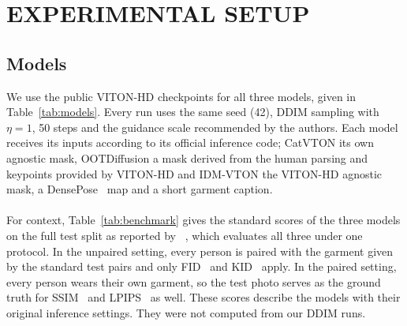 \section{\uppercase{Experimental Setup}}
\label{sec:setup}

\subsection{Models}
We use the public VITON-HD checkpoints for all three models, given in Table~\ref{tab:models}. Every run uses the same seed (42), DDIM sampling with $\eta = 1$, 50 steps and the guidance scale recommended by the authors. Each model receives its inputs according to its official inference code; CatVTON its own agnostic mask, OOTDiffusion a mask derived from the human parsing and keypoints provided by VITON-HD and IDM-VTON the VITON-HD agnostic mask, a DensePose~\cite{guler2018densepose} map and a short garment caption.
\\ \\
For context, Table~\ref{tab:benchmark} gives the standard scores of the three models on the full \vitonhd test split as reported by \catvton~\cite{chong2025catvton}, which evaluates all three under one protocol. In the unpaired setting, every person is paired with the garment given by the standard test pairs and only FID~\cite{heusel2017fid} and KID~\cite{binkowski2018kid} apply. In the paired setting, every person wears their own garment, so the test photo serves as the ground truth for SSIM~\cite{wang2004ssim} and LPIPS~\cite{zhang2018lpips} as well. These scores describe the models with their original inference settings. They were not computed from our DDIM runs.
\\ \\
\begin{table}[h]
\caption{Models and sampling settings of the trajectory analysis. All models are sampled with DDIM, $\eta = 1$, 50 steps; CFG corresponds to the classifier-free guidance scale.}
\label{tab:models}
\centering
\small
\setlength{\tabcolsep}{3pt}
\end{table}

